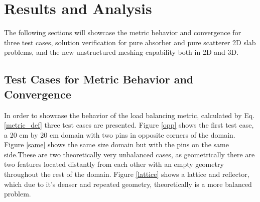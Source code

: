 \documentclass{anstrans}
\begin{document}
\section{Results and Analysis}

The following sections will showcase the metric behavior and convergence for three test cases, solution verification for pure absorber and pure scatterer 2D slab problems, and the new unstructured meshing capability both in 2D and 3D.

\subsection{Test Cases for Metric Behavior and Convergence}
\label{sec:convergence}
In order to showcase the behavior of the load balancing metric, calculated by Eq. \ref{metric_def} three test cases are presented. Figure \ref{opp} shows the first test case, a 20 cm by 20 cm domain with two pins in opposite corners of the domain. Figure \ref{same} shows the same size domain but with the pins on the same side.These are two theoretically very unbalanced cases, as geometrically there are two features located distantly from each other with an empty geometry throughout the rest of the domain. Figure \ref{lattice} shows a lattice and reflector, which due to it's denser and repeated geometry, theoretically is a more balanced problem. 
\end{document}
